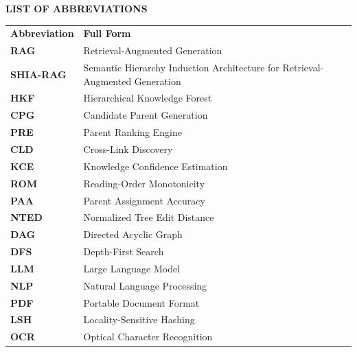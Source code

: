 \documentclass[12pt,a4paper]{report}
\begin{document}
\tableofcontents
\clearpage

\listoffigures
\clearpage

\listoftables
\clearpage

\begin{center}
    {\Large\bfseries LIST OF ABBREVIATIONS}
\end{center}
\vspace{6mm}

\noindent
\begin{table}[h!]
\centering
\begin{tabular}{p{3.5cm}p{10.5cm}}
\textbf{Abbreviation} & \textbf{Full Form} \\[3mm]
\textbf{RAG} & Retrieval-Augmented Generation \\
\textbf{SHIA-RAG} & Semantic Hierarchy Induction Architecture for Retrieval-Augmented Generation \\
\textbf{HKF} & Hierarchical Knowledge Forest \\
\textbf{CPG} & Candidate Parent Generation \\
\textbf{PRE} & Parent Ranking Engine \\
\textbf{CLD} & Cross-Link Discovery \\
\textbf{KCE} & Knowledge Confidence Estimation \\
\textbf{ROM} & Reading-Order Monotonicity \\
\textbf{PAA} & Parent Assignment Accuracy \\
\textbf{NTED} & Normalized Tree Edit Distance \\
\textbf{DAG} & Directed Acyclic Graph \\
\textbf{DFS} & Depth-First Search \\
\textbf{LLM} & Large Language Model \\
\textbf{NLP} & Natural Language Processing \\
\textbf{PDF} & Portable Document Format \\
\textbf{LSH} & Locality-Sensitive Hashing \\
\textbf{OCR} & Optical Character Recognition \\
\end{tabular}
\end{table}
\clearpage

\setcounter{page}{1}
\end{document}
